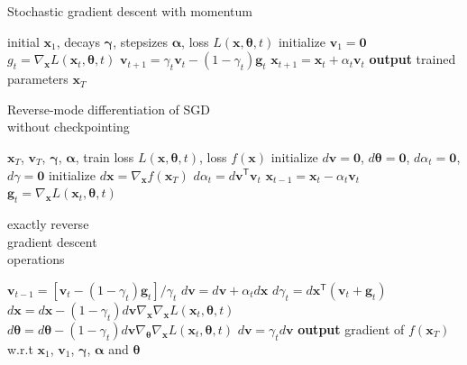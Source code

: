 \documentclass{article}
\newcommand{\vx}{\mathbf{x}}
\newcommand{\vv}{\mathbf{v}}
\newcommand{\vg}{\mathbf{g}}
\newcommand{\vzero}{\mathbf{0}}
\newcommand{\tra}{^{\mathsf{T}}}
\newcommand{\hypers}{{\boldsymbol{\theta}}}
\newcommand{\params}{\vx}
\newcommand{\decay}{\gamma}
\newcommand{\decays}{{\boldsymbol{\decay}}}
\newcommand{\stepsize}{\alpha}
\newcommand{\stepsizes}{{\boldsymbol{\stepsize}}}
\newcommand{\gradparams}{\nabla_\params L(\params_t, \hypers, t)}
\begin{document}
\begin{algorithm}
   \caption{Stochastic gradient descent with momentum}
   \label{alg:sgd}
\begin{algorithmic}[1]
    initial $\vx_1$, decays $\decays$, stepsizes $\stepsizes$, loss $L(\params, \hypers, t)$
   \State initialize $\vv_1 = \vzero$
   \State $g_t = \gradparams$ 
   \State $\vv_{t+1} = \decay_t \vv_t - (1 - \decay_t) \vg_t$   \label{step:update velocity}
   \State $\vx_{t+1} = \vx_t + \stepsize_t \vv_t$  \label{step:update position}
   \EndFor
   \State \textbf{output} trained parameters $\vx_T$
\end{algorithmic}
\end{algorithm}
%
\begin{algorithm}
   \caption{Reverse-mode differentiation of SGD \\ without checkpointing}
   \label{alg:reverse-sgd}
\begin{algorithmic}[1]
    $\vx_T$, $\vv_T$, $\decays$, $\stepsizes$, train loss $L(\params, \hypers, t)$, loss $f(\params)$
   \State initialize $d\vv = \vzero$, $d\hypers = \vzero$, $d\stepsize_t = \vzero$, $d\decay = \vzero$
   \State initialize $d\vx = \nabla_\params f(\params_T)$
   \State $d\stepsize_t = d\vv\tra \vv_t$
   \State $\vx_{t-1} = \vx_t - \stepsize_t \vv_t$ \label{step:reverse-position}
   \vspace{-0.95\baselineskip}
   \State $\vg_t = \gradparams$ \label{step:reverse-gradient}
   \hfill \scalebox{1.1}{\Bigg\}} \vspace{-\baselineskip} \begin{minipage}{2.5cm} exactly reverse \\ gradient descent \\ operations \strut \end{minipage}
   \State $\vv_{t-1} = [\vv_t - (1 - \decay_t) \vg_t] / \decay_t$ \label{step:reverse-velocity}
   \State $d\vv = d\vv + \stepsize_t d\vx$
   \State $d\decay_t = d\vx\tra (\vv_t + \vg_t)$
   \State $d\vx = d\vx - (1 - \decay_t) d\vv \nabla_\params \gradparams$ \label{line:hvp1}
   \State $d\hypers = d\hypers - (1 - \decay_t) d\vv \nabla_\hypers \gradparams$ \label{line:hvp2}
   \State $d\vv = \decay_t d\vv$
   \EndFor
   \State \textbf{output} gradient of $f(\vx_T)$ w.r.t $\vx_1$, $\vv_1$, $\decays$, $\stepsizes$ and $\hypers$
\end{algorithmic}
\end{algorithm}
\end{document}
